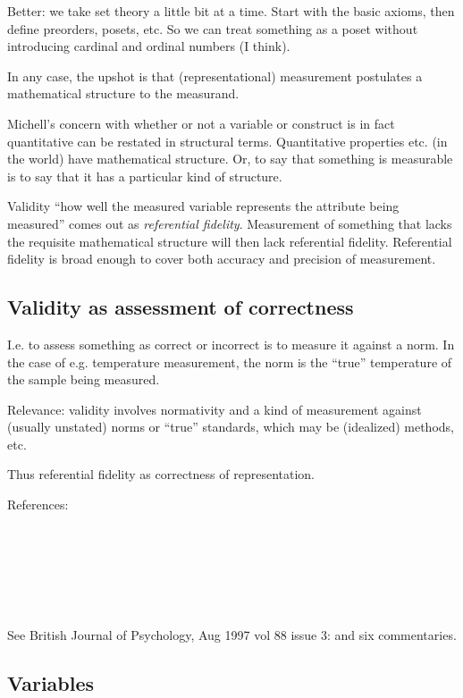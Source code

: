 \documentclass[11pt,twoside]{article}
\begin{document}
\begin{appendices}
Better: we take set theory a little bit at a time.  Start with the
basic axioms, then define preorders, posets, etc.  So we can treat
something as a poset without introducing cardinal and ordinal numbers
(I think).

In any case, the upshot is that (representational) measurement
postulates a mathematical structure to the measurand.

Michell's concern with whether or not a variable or construct is in
fact quantitative can be restated in structural terms.  Quantitative
properties etc. (in the world) have mathematical structure.  Or, to
say that something is measurable is to say that it has a particular
kind of structure.

Validity ``how well the measured variable represents the attribute
being measured'' comes out as \textit{referential fidelity}.  Measurement
of something that lacks the requisite mathematical structure will then
lack referential fidelity.  Referential fidelity is broad enough to
cover both accuracy and precision of measurement.

\subsection{Validity as assessment of correctness}

I.e. to assess something as correct or incorrect is to measure it
against a norm.  In the case of e.g. temperature measurement, the norm
is the ``true'' temperature of the sample being measured.

Relevance: validity involves normativity and a kind of measurement
against (usually unstated) norms or ``true'' standards, which may be
(idealized) methods, etc.

Thus referential fidelity as correctness of representation.

\noindent References:

\noindent
\cite{chang_inventing_2004} \\
\cite{chang_measurement_2004} \\
\cite{chang_spirit_2004} \\
\cite{martin_counting_2009} \\
\cite{michell_normal_2000}\\
\cite{sherry_thermoscopes_2011}

See British Journal of Psychology, Aug 1997 vol 88 issue 3:
\cite{michell_quantitative_1997} and six commentaries.

\subsection{Variables}


\end{appendices}
\end{document}

